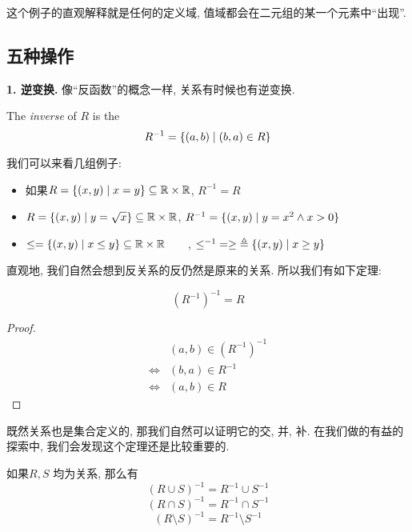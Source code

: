 这个例子的直观解释就是任何的定义域, 值域都会在二元组的某一个元素中``出现''. 

\subsection{五种操作}

\textbf{1. 逆变换. }像``反函数''的概念一样, 关系有时候也有逆变换. 

\begin{definition}[逆 (Inverse)]
  The {\it inverse} of $R$ is the 
  \[
    R^{-1} = \{(a, b) \mid (b, a) \in R\}
  \]
\end{definition}

我们可以来看几组例子: 
\begin{itemize}
  \item 如果$R = \{(x, y) \mid x = y\}\subseteq \mathbb{R} \times \mathbb{R}$, $R^{-1} = R$
  \item $R = \{(x, y) \mid y = \sqrt{x}\} \subseteq \mathbb{R} \times \mathbb{R}$, $R^{-1} = \{(x, y) \mid y = x^{2} \land x > 0\}$
  \item $\le = \{(x, y) \mid x \le y\} \subseteq \mathbb{R} \times \mathbb{R} \qquad$, $\le^{-1} \;= \ge \;\triangleq \{(x, y) \mid x \ge y\}$
\end{itemize}

直观地, 我们自然会想到反关系的反仍然是原来的关系. 所以我们有如下定理: 

\begin{theorem}
  \[
    (R^{-1})^{-1} = R
  \]
\end{theorem}

\begin{proof}
  \setcounter{equation}{0}
  \begin{align}
    &(a, b) \in (R^{-1})^{-1} \\
    \iff& (b, a) \in R^{-1} \\
    \iff& (a, b) \in R
  \end{align}
\end{proof}

既然关系也是集合定义的, 那我们自然可以证明它的交, 并, 补. 在我们做的有益的探索中, 我们会发现这个定理还是比较重要的. 

\begin{theorem}[关系的逆]
    如果$R, S$ 均为关系, 那么有
  \[
    (R \cup S)^{-1} = R^{-1} \cup S^{-1}
  \]
  \[
    (R \cap S)^{-1} = R^{-1} \cap S^{-1}
  \]
  \[
    (R \setminus S)^{-1} = R^{-1} \setminus S^{-1}
  \]
\end{theorem}

